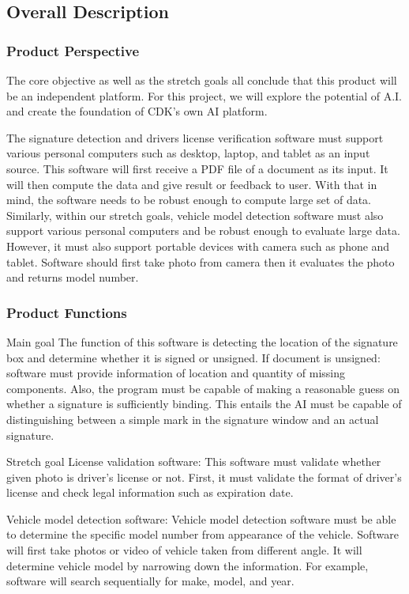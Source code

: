 \documentclass[article, onecolumn, draftclsnofoot,10pt, compsoc]{IEEEtran}
\begin{document}
\subsection{Overall Description}
\subsubsection{Product Perspective}
The core objective as well as the stretch goals all conclude that this product will be an independent platform. For this project, we will explore the potential of A.I. and create the foundation of CDK’s own AI platform.

The signature detection and drivers license verification software must support various personal computers such as desktop, laptop, and tablet as an input source. This software will first receive a PDF file of a document as its input. It will then compute the data and give result or feedback to user. With that in mind, the software needs to be robust enough to compute large set of data. Similarly, within our stretch goals, vehicle model detection software must also support various personal computers and be robust enough to evaluate large data. However, it must also support portable devices with camera such as phone and tablet. Software should first take photo from camera then it evaluates the photo and returns model number.

\subsubsection{Product Functions}
Main goal
The function of this software is detecting the location of the signature box and determine whether it is signed or unsigned. If document is unsigned: software must provide information of location and quantity of missing components. Also, the program must be capable of making a reasonable guess on whether a signature is sufficiently binding. This entails the AI must be capable of distinguishing between a simple mark in the signature window and an actual signature.

Stretch goal
License validation software: This software must validate whether given photo is driver’s license or not. First, it must validate the format of driver’s license and check legal information such as expiration date.

Vehicle model detection software: Vehicle model detection software must be able to determine the specific model number from appearance of the vehicle. Software will first take photos or video of vehicle taken from different angle. It will determine vehicle model by narrowing down the information. For example, software will search sequentially for make, model, and year.
\end{document}
